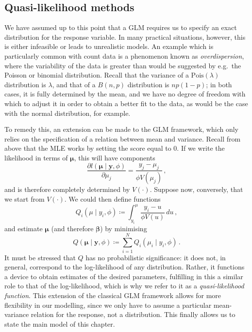 \documentclass[a4paper]{book}
\begin{document}
\subsection{Quasi-likelihood methods} \label{subsec:quasi}

We have assumed up to this point that a GLM requires us to specify an exact distribution for the response variable. In many practical situations, however, this is either infeasible or leads to unrealistic models. An example which is particularly common with count data is a phenomenon known as \emph{overdispersion}, where the variability of the data is greater than would be suggested by e.g.\ the Poisson or binomial distribution. Recall that the variance of a $\mathrm{Pois}(\lambda)$ distribution is $\lambda$, and that of a $B(n, p)$ distribution is $np(1 - p)$; in both cases, it is fully determined by the mean, and we have no degree of freedom with which to adjust it in order to obtain a better fit to the data, as would be the case with the normal distribution, for example.

To remedy this, an extension can be made to the GLM framework, which only relies on the specification of a relation between mean and variance. Recall from above that the MLE works by setting the score equal to $0$. If we write the likelihood in terms of $\bm{\mu}$, this will have components
\begin{equation} \label{eq:lhood-mean-param}
  \frac{\partial l(\bm{\mu} \mid \mathbf{y}, \phi)}{\partial \mu_j} = \frac{y_j - \mu_j}{\phi V(\mu_j)} \,,
\end{equation}
and is therefore completely determined by $V(\cdot)$. Suppose now, conversely, that we start from $V(\cdot)$. We could then define functions
\begin{equation}
  Q_i(\mu \mid y_i, \phi) \coloneqq \int_{y_i}^{\mu} \frac{y_i - u}{\phi V(u)} \, du \,,
\end{equation}
and estimate $\bm{\mu}$ (and therefore $\bm{\beta}$) by minimising
\begin{equation}
  Q(\bm{\mu} \mid \mathbf{y}, \phi) \coloneqq \sum_{i = 1}^N Q_i(\mu_i \mid y_i, \phi) \,.
\end{equation}
It must be stressed that $Q$ has no probabilistic significance: it does not, in general, correspond to the log-likelihood of any distribution. Rather, it functions a device to obtain estimates of the desired parameters, fulfilling in this a similar role to that of the log-likelihood, which is why we refer to it as a \emph{quasi-likelihood function}. This extension of the classical GLM framework allows for more flexibility in our modelling, since we only have to assume a particular mean-variance relation for the response, not a distribution. This finally allows us to state the main model of this chapter.
\end{document}

